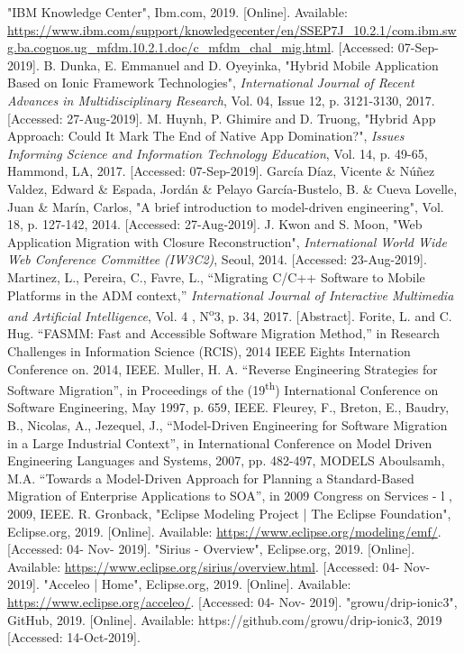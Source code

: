 \documentclass[conference]{IEEEtran}
\begin{document}
\begin{thebibliography}{00}
 "IBM Knowledge Center", Ibm.com, 2019. [Online]. Available: \url{https://www.ibm.com/support/knowledgecenter/en/SSEP7J_10.2.1/com.ibm.swg.ba.cognos.ug_mfdm.10.2.1.doc/c_mfdm_chal_mig.html}. [Accessed: 07-Sep-2019].
 B. Dunka, E. Emmanuel and D. Oyeyinka, "Hybrid Mobile Application Based on Ionic Framework Technologies", \textit{International Journal of Recent Advances in Multidisciplinary Research}, Vol. 04, Issue 12, p. 3121-3130, 2017. [Accessed: 27-Aug-2019].
 M. Huynh, P. Ghimire and D. Truong, "Hybrid App Approach: Could It Mark The End of Native App Domination?", \textit{Issues Informing Science and Information Technology Education}, Vol. 14, p. 49-65, Hammond, LA, 2017. [Accessed: 07-Sep-2019].
 García Díaz, Vicente \& Núñez Valdez, Edward \& Espada, Jordán  \& Pelayo García-Bustelo, B. \& Cueva Lovelle, Juan \& Marín, Carlos, "A brief introduction to model-driven engineering", Vol. 18, p. 127-142, 2014. [Accessed: 27-Aug-2019].
 J. Kwon and S. Moon, "Web Application Migration with Closure Reconstruction", \textit{International World Wide Web Conference Committee (IW3C2)}, Seoul, 2014. [Accessed: 23-Aug-2019].
 Martinez, L., Pereira, C., Favre, L., ``Migrating C/C++ Software to Mobile Platforms in the ADM context,'' \textit{International Journal of Interactive Multimedia and Artificial Intelligence}, Vol. 4 , N\textsuperscript{o}3, p. 34, 2017. [Abstract].
 Forite, L. and C. Hug. ``FASMM: Fast and Accessible Software Migration Method,'' in Research Challenges in Information Science (RCIS), 2014 IEEE Eights Internation Conference on. 2014, IEEE.
 Muller, H. A. ``Reverse Engineering Strategies for Software Migration'', in Proceedings of the (19\textsuperscript{th}) International Conference on Software Engineering, May 1997, p. 659, IEEE.
 Fleurey, F., Breton, E., Baudry, B., Nicolas, A., Jezequel, J., ``Model-Driven Engineering for Software Migration in a Large Industrial Context'', in International Conference on Model Driven Engineering Languages and Systems, 2007, pp. 482-497, MODELS
 Aboulsamh, M.A. ``Towards a Model-Driven Approach for Planning a Standard-Based Migration of Enterprise Applications to SOA'', in 2009 Congress on Services - l , 2009, IEEE.
 R. Gronback, "Eclipse Modeling Project | The Eclipse Foundation", Eclipse.org, 2019. [Online]. Available: \url{https://www.eclipse.org/modeling/emf/}. [Accessed: 04- Nov- 2019].
 "Sirius - Overview", Eclipse.org, 2019. [Online]. Available: \url{https://www.eclipse.org/sirius/overview.html}. [Accessed: 04- Nov- 2019].
 "Acceleo | Home", Eclipse.org, 2019. [Online]. Available: \url{https://www.eclipse.org/acceleo/}. [Accessed: 04- Nov- 2019].
 "growu/drip-ionic3", GitHub, 2019. [Online]. Available: https://github.com/growu/drip-ionic3, 2019 [Accessed: 14-Oct-2019].
\end{thebibliography}
\vspace{12pt}
\color{red}
\end{document}
